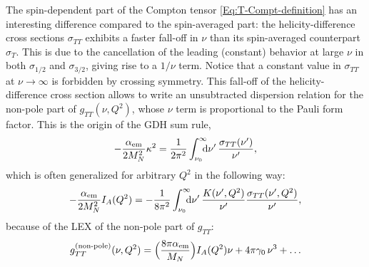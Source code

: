 \documentclass[twocolumn,prc,showpacs,nofootinbib,preprintnumbers,amsmath,amssymb,superscriptaddress]{revtex4-1}
\def\dd{\mathrm{d}}
\begin{document}
The spin-dependent part of the Compton tensor \eqref{Eq:T-Compt-definition} has an interesting difference compared to the spin-averaged part: the helicity-difference cross sections $\sigma_{TT}$ exhibits a faster fall-off in $\nu$ than its spin-averaged counterpart $\sigma_{T}$. 
This is due to the cancellation of the leading (constant) behavior at large $\nu$ in both $\sigma_{1/2}$ and $\sigma_{3/2}$, giving rise to a $1/\nu$ term.
Notice that a constant value in $\sigma_{TT}$ at $\nu\to \infty$ is forbidden by crossing symmetry.
This fall-off of the helicity-difference cross section allows to write an unsubtracted dispersion relation for the non-pole part of $g_{TT}(\nu,Q^2)$, whose $\nu$ term is proportional to the Pauli form factor.
This is the origin of the GDH sum rule,
\begin{align}
-\frac{\alpha_{\rm em}}{2 M_N^2}\kappa^2 = \frac{1}{2 \pi^2} \int_{\nu_0}^\infty \!\!\!\! \dd\nu'\,\frac{\sigma_{TT} (\nu')}{\nu'}, \label{Eq:GDH-SumRule}
\end{align}
which is often generalized for arbitrary $Q^2$ in the following way:
\begin{align}
-\frac{\alpha_{\rm em}}{2 M_N^2}I_A(Q^2) = -\frac{1}{8 \pi^2} \int_{\nu_0}^\infty \!\!\!\! \dd\nu'\, \frac{K(\nu',Q^2)}{\nu'} \frac{\sigma_{TT} (\nu',Q^2)}{\nu'}, \label{Eq:IA-SumRule}
\end{align}
because of the LEX of the non-pole part of $g_{TT}$:
\begin{align}
g_{TT}^{\text{(non-pole)}}(\nu,Q^2) =  \Big( \frac{8 \pi\alpha_{\rm em}}{M_N} \Big)  I_A(Q^2) \nu + 4\pi \gamma_0\, \nu^3 + \dots\label{Eq:LEX-gTTnp}
\end{align}

\end{document}
